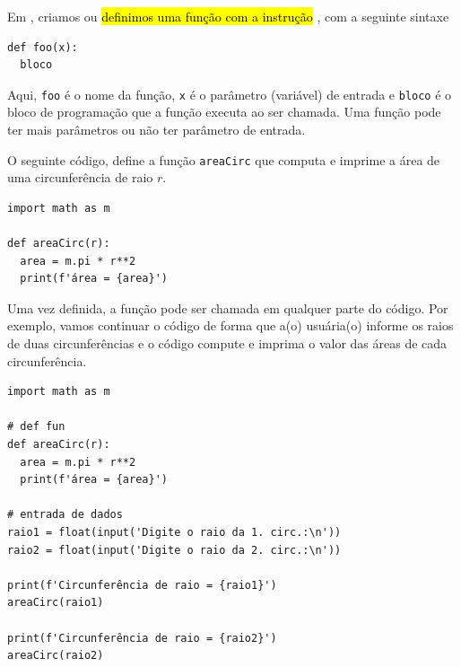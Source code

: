 Em {\python}, criamos ou \hl{definimos uma função com a instrução {\PYTHONdef}}, com a seguinte sintaxe

\begin{lstlisting}
def foo(x):
  bloco
\end{lstlisting}

Aqui, \lstinline+foo+ é o nome da função, \lstinline+x+ é o parâmetro (variável) de entrada e \lstinline+bloco+ é o bloco de programação que a função executa ao ser chamada. Uma função pode ter mais parâmetros ou não ter parâmetro de entrada.

\begin{ex}\label{cap_fun_sec_def:ex:areaCirc}
  O seguinte código, define a função \lstinline+areaCirc+ que computa e imprime a área de uma circunferência de raio $r$.

\begin{lstlisting}
import math as m

def areaCirc(r):
  area = m.pi * r**2
  print(f'área = {area}')
\end{lstlisting}

Uma vez definida, a função pode ser chamada em qualquer parte do código. Por exemplo, vamos continuar o código de forma que a(o) usuária(o) informe os raios de duas circunferências e o código compute e imprima o valor das áreas de cada circunferência.

\begin{lstlisting}
import math as m

# def fun
def areaCirc(r):
  area = m.pi * r**2
  print(f'área = {area}')
    
# entrada de dados
raio1 = float(input('Digite o raio da 1. circ.:\n'))
raio2 = float(input('Digite o raio da 2. circ.:\n'))

print(f'Circunferência de raio = {raio1}')
areaCirc(raio1)

print(f'Circunferência de raio = {raio2}')
areaCirc(raio2)
\end{lstlisting}

\end{ex}

